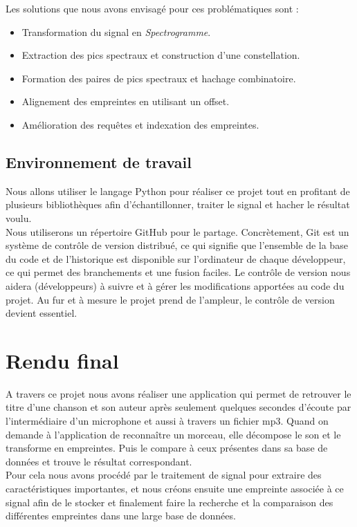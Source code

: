\documentclass[10pt, english]{report}
\begin{document}
Les solutions que nous avons envisagé pour ces problématiques sont :\\

\begin{itemize}
	\item 	Transformation du signal en \textit{Spectrogramme}.
	\item 	Extraction des pics spectraux et construction d'une constellation.
	\item	Formation des paires de pics spectraux et hachage combinatoire.
	\item 	Alignement des empreintes en utilisant un offset.
	\item 	Amélioration des requêtes et indexation des empreintes.
\end{itemize}

\section{Environnement de travail}
Nous allons utiliser le langage Python pour réaliser ce projet tout en profitant de plusieurs bibliothèques afin d'échantillonner, traiter le signal et hacher le résultat voulu.\\

Nous utiliserons un répertoire GitHub pour le partage. Concrètement, Git est un système de contrôle de version distribué, ce qui signifie que l’ensemble de la base du code et de l’historique est disponible sur l’ordinateur de chaque développeur, ce qui permet des branchements et une fusion faciles.
Le contrôle de version nous aidera (développeurs) à suivre et à gérer les modifications apportées au code du projet. Au fur et à mesure le projet prend de l’ampleur, le contrôle de version devient essentiel.\\



\chapter{Rendu final}
\label{rf}
A travers ce projet nous avons réaliser une application qui permet de retrouver le titre d’une chanson et son auteur après seulement quelques secondes d’écoute par l'intermédiaire d'un microphone et aussi à travers un fichier mp3.
Quand on demande à l’application de reconnaître un morceau, elle décompose le son et le transforme en empreintes. Puis le compare à ceux présentes dans sa base de données et trouve le résultat correspondant.\\
Pour cela nous avons procédé par le traitement de signal pour extraire des caractéristiques importantes, et nous créons ensuite une empreinte associée à ce signal afin de le stocker et finalement faire la recherche et la comparaison des différentes empreintes dans une large base de données.
\end{document}
